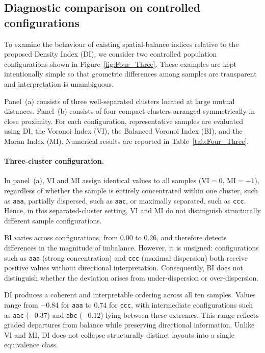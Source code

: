 \documentclass[12pt]{imsart}
\theoremstyle{plain}
\theoremstyle{remark}
\begin{document}
\subsection{Diagnostic comparison on controlled configurations}
\label{Exm:DI_two_small_popu}
To examine the behaviour of existing spatial-balance indices relative to the
proposed Density Index (DI), we consider two controlled population
configurations shown in Figure~\ref{fig:Four_Three}. These examples are kept
intentionally simple so that geometric differences among samples are
transparent and interpretation is unambiguous.

Panel~(a) consists of three well-separated clusters located at large mutual
distances. Panel~(b) consists of four compact clusters arranged symmetrically
in close proximity. For each configuration, representative samples are
evaluated using DI, the Voronoi Index (VI), the Balanced Voronoi Index (BI),
and the Moran Index (MI). Numerical results are reported in
Table~\ref{tab:Four_Three}.

\paragraph{Three-cluster configuration.}

In panel~(a), VI and MI assign identical values to all samples
(\(\mathrm{VI}=0\), \(\mathrm{MI}=-1\)), regardless of whether the sample is
entirely concentrated within one cluster, such as \texttt{aaa}, partially
dispersed, such as \texttt{aac}, or maximally separated, such as
\texttt{ccc}. Hence, in this separated-cluster setting, VI and MI do not
distinguish structurally different sample configurations.

BI varies across configurations, from \(0.00\) to \(0.26\), and therefore
detects differences in the magnitude of imbalance. However, it is unsigned:
configurations such as \texttt{aaa} (strong concentration) and \texttt{ccc}
(maximal dispersion) both receive positive values without directional
interpretation. Consequently, BI does not distinguish whether the deviation
arises from under-dispersion or over-dispersion.

DI produces a coherent and interpretable ordering across all ten samples.
Values range from \(-0.84\) for \texttt{aaa} to \(0.74\) for \texttt{ccc},
with intermediate configurations such as \texttt{aac} (\(-0.37\)) and
\texttt{abc} (\(-0.12\)) lying between these extremes. This range reflects
graded departures from balance while preserving directional information.
Unlike VI and MI, DI does not collapse structurally distinct layouts into a
single equivalence class.
\end{document}
